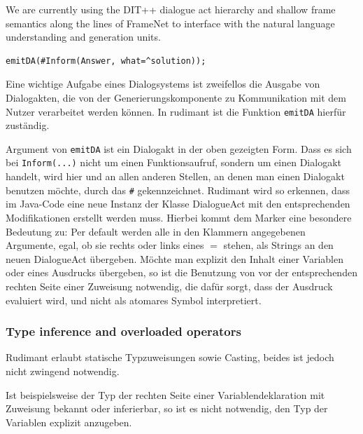 We are currently using the DIT++ dialogue act hierarchy \cite{bunt2012iso} and
shallow frame semantics along the lines of FrameNet
\cite{ruppenhofer2016framenet} to interface with the natural language
understanding and generation units.

\begin{small}
\begin{verbatim}
emitDA(#Inform(Answer, what=^solution));
\end{verbatim}
\end{small}
Eine wichtige Aufgabe eines Dialogsystems ist zweifellos die Ausgabe von
Dialogakten, die von der Generierungskomponente zu Kommunikation mit dem Nutzer
verarbeitet werden können. In rudimant ist die Funktion \texttt{emitDA} hierfür
zuständig.

Argument von \texttt{emitDA} ist ein Dialogakt in der oben gezeigten Form. Dass
es sich bei \texttt{Inform}\verb|(...)| nicht um einen Funktionsaufruf, sondern
um einen Dialogakt handelt, wird hier und an allen anderen Stellen, an denen
man einen Dialogakt benutzen möchte, durch das \verb|#|
gekennzeichnet. Rudimant wird so erkennen, dass im Java-Code eine neue Instanz
der Klasse DialogueAct mit den entsprechenden Modifikationen erstellt werden
muss. Hierbei kommt dem Marker \caret{} eine besondere Bedeutung zu: Per
default werden alle in den Klammern angegebenen Argumente, egal, ob sie rechts
oder links eines $=$ stehen, als Strings an den neuen DialogueAct
übergeben. Möchte man explizit den Inhalt einer Variablen oder eines Ausdrucks
übergeben, so ist die Benutzung von \caret{} vor der entsprechenden rechten
Seite einer Zuweisung notwendig, die dafür sorgt, dass der Ausdruck evaluiert
wird, und nicht als atomares Symbol interpretiert.

\subsubsection{Type inference and overloaded operators}
\label{typeinference}

Rudimant erlaubt statische Typzuweisungen sowie Casting, beides ist jedoch
nicht zwingend notwendig.

Ist beispielsweise der Typ der rechten Seite einer Variablendeklaration mit
Zuweisung bekannt oder inferierbar, so ist es nicht notwendig, den Typ der
Variablen explizit anzugeben.

